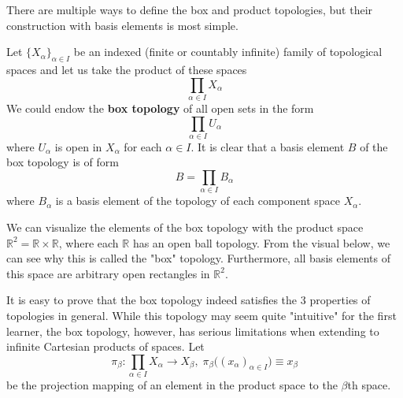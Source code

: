 \documentclass{article}
\begin{document}
    There are multiple ways to define the box and product topologies, but their construction with basis elements is most simple. 

    \begin{definition}
    Let $\{X_\alpha\}_{\alpha \in I}$ be an indexed (finite or countably infinite) family of topological spaces and let us take the product of these spaces
    \[\prod_{\alpha \in I} X_\alpha\]
    We could endow the \textbf{box topology} of all open sets in the form
    \[\prod_{\alpha \in I} U_\alpha\]
    where $U_\alpha$ is open in $X_\alpha$ for each $\alpha \in I$. It is clear that a basis element $B$ of the box topology is of form
    \[B = \prod_{\alpha \in I} B_\alpha\]
    where $B_\alpha$ is a basis element of the topology of each component space $X_\alpha$. 
    \end{definition}

    We can visualize the elements of the box topology with the product space $\mathbb{R}^2 = \mathbb{R} \times \mathbb{R}$, where each $\mathbb{R}$ has an open ball topology. From the visual below, we can see why this is called the "box" topology. Furthermore, all basis elements of this space are arbitrary open rectangles in $\mathbb{R}^2$. 
    \begin{center}
    \end{center}

    It is easy to prove that the box topology indeed satisfies the 3 properties of topologies in general. While this topology may seem quite "intuitive" for the first learner, the box topology, however, has serious limitations when extending to infinite Cartesian products of spaces. Let 
    \[\pi_\beta: \prod_{\alpha \in I} X_\alpha \longrightarrow X_\beta, \; \pi_\beta \big( (x_\alpha)_{\alpha \in I}\big) \equiv x_\beta\] 
    be the projection mapping of an element in the product space to the $\beta$th space. 
\end{document}
